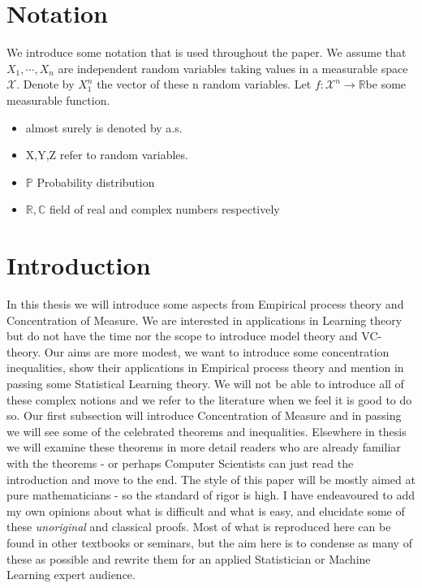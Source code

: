 \documentclass[12pt, oneside, a4paper]{article}
\theoremstyle{plain}
\theoremstyle{definition}
\begin{document}
\flushleft
\newpage
\section{Notation}
We introduce some notation that is used throughout the paper. We assume
that $X_1, \cdots , X_n$ are independent random variables taking values in a
measurable space $\mathcal{X}$. Denote by $X_1^n$ the vector of these n random
variables. Let $f: \mathcal{X}^n \rightarrow \mathbb{R} $be some measurable function.
\begin{itemize}
 \item almost surely is denoted by a.s.
\item X,Y,Z refer to random variables.
\item $\mathbb{P}$ Probability distribution
\item $\mathbb{R,C}$ field of real and complex numbers respectively
\end{itemize}
\newpage
\section{Introduction}
In this thesis we will introduce some aspects from Empirical process theory and Concentration of Measure. We are interested in applications in Learning 
theory but do not have the time nor the scope to introduce model theory and VC-theory. Our aims are more modest, we want to introduce some concentration
inequalities, show their applications in Empirical process theory and mention in passing some Statistical Learning theory. We will not be able to 
introduce all of these complex notions and we refer to the literature when we feel it is good to do so.  
Our first subsection will introduce Concentration of Measure and in passing we will see some of the celebrated theorems and inequalities. Elsewhere in 
thesis we will examine these theorems in more detail readers who are already familiar with the theorems - or perhaps Computer Scientists can just read
the introduction and move to the end. 
The style of this paper will be mostly aimed at pure mathematicians - so the standard of rigor is high. I have endeavoured to add my own opinions about
what is difficult and what is easy, and elucidate some of these \textit{unoriginal} and classical proofs. Most of what is reproduced here can be found 
in other textbooks or seminars, but the aim here is to condense as many of these as possible and rewrite them for an applied Statistician or Machine 
Learning expert audience. 
\end{document}
